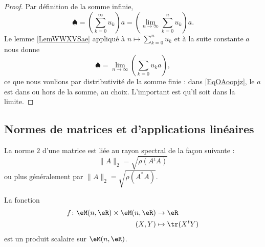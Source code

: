 \begin{proof}
    Par définition de la somme infinie,
    \begin{equation}
        \spadesuit=\left( \sum_{k=0}^{\infty}u_k \right)a=\left( \lim_{n\to \infty} \sum_{k=0}^nu_k \right)a.
    \end{equation}
    Le lemme \ref{LemWWXVSae} appliqué à \( n\mapsto\sum_{k=0}^nu_k\) et à la suite constante \( a\) nous donne
    \begin{equation}    \label{EqOAoopjz}
        \spadesuit=\lim_{n\to \infty} \left( \sum_{k=0}u_ka \right),
    \end{equation}
    ce que nous voulions par distributivité de la somme finie : dans \eqref{EqOAoopjz}, le \( a\) est dans ou hors de la somme, au choix. L'important est qu'il soit dans la limite.
\end{proof}

\subsection{Normes de matrices et d'applications linéaires}
\label{subsecNomrApplLin}

\begin{theorem}       \label{THOooNDQSooOUWQrK}
    La norme $2$ d'une matrice est liée au rayon spectral de la façon suivante :
    \begin{equation}
        \|A\|_2=\sqrt{\rho(A{^t}A)}
    \end{equation}
    ou plus généralement par \( \| A \|_2=\sqrt{\rho(A^*A)}\).
\end{theorem}

\begin{proposition} \label{PropMAQoKAg}
    La fonction
    \begin{equation}
        \begin{aligned}
            f\colon \eM(n,\eR)\times \eM(n,\eR)&\to \eR \\
            (X,Y)&\mapsto \tr(X^tY) 
        \end{aligned}
    \end{equation}
    est un produit scalaire sur \( \eM(n,\eR)\).
\end{proposition}

